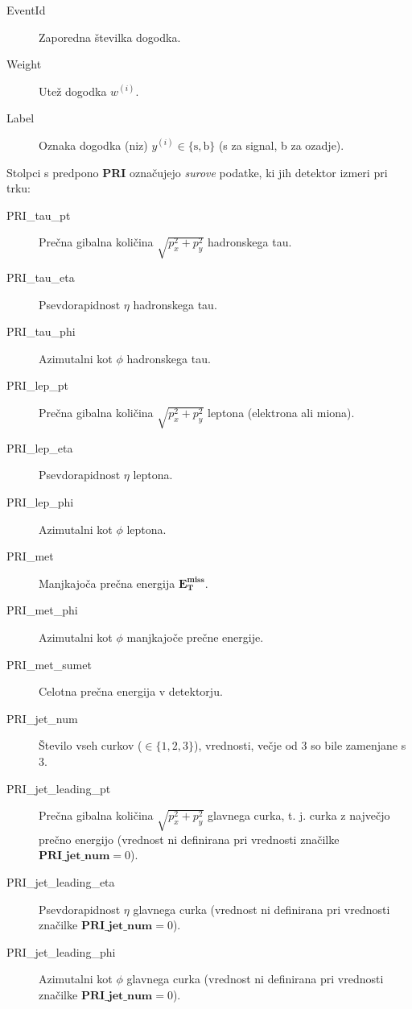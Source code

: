 \documentclass[11pt,a4paper,openany]{book}
\begin{document}
\begin{changemargin}{0.5cm}{0.0cm} 
\begin{description}
	\item [EventId] 	Zaporedna številka dogodka.
	\item [Weight]  	Utež dogodka $w^{(i)}$.
	\item [Label] 		Oznaka dogodka (niz) $y^{(i)} \in \{\text{s}, \text{b}\}$ (s za signal, b za ozadje).	
\end{description}
\end{changemargin}

Stolpci s predpono \textbf{PRI} označujejo \textit{surove} podatke, ki jih detektor izmeri pri trku:
\begin{changemargin}{0.5cm}{0.0cm} 
\begin{description}
	\item[PRI\_tau\_pt] Prečna gibalna količina $\sqrt{p_x^2 + p_y^2}$ hadronskega tau.
	\item[PRI\_tau\_eta] Psevdorapidnost $\eta$ hadronskega tau.
	\item[PRI\_tau\_phi] Azimutalni kot $\phi$ hadronskega tau.
	
	\item[PRI\_lep\_pt] Prečna gibalna količina $\sqrt{p_x^2 + p_y^2}$ leptona (elektrona ali miona).
	\item[PRI\_lep\_eta] Psevdorapidnost $\eta$ leptona.
	\item[PRI\_lep\_phi] Azimutalni kot $\phi$ leptona.
	
	\item[PRI\_met] Manjkajoča prečna energija $\mathbf{E_T^{\text{miss}}}$.
	\item[PRI\_met\_phi] Azimutalni kot $\phi$ manjkajoče prečne energije.
	
	\item[PRI\_met\_sumet] Celotna prečna energija v detektorju.
	
	\item[PRI\_jet\_num] Število vseh curkov ($\in \{1, 2, 3\}$), vrednosti, večje od $3$ so bile zamenjane s 3.
	
	\item[PRI\_jet\_leading\_pt] Prečna gibalna količina $\sqrt{p_x^2 + p_y^2}$ glavnega curka, t. j. curka z največjo prečno energijo (vrednost ni definirana pri vrednosti značilke $\textbf{PRI\_jet\_num} = 0$).
	\item[PRI\_jet\_leading\_eta] Psevdorapidnost $\eta$ glavnega curka (vrednost ni definirana pri vrednosti značilke $\textbf{PRI\_jet\_num} = 0$).
	\item[PRI\_jet\_leading\_phi] Azimutalni kot $\phi$ glavnega curka (vrednost ni definirana pri vrednosti značilke $\textbf{PRI\_jet\_num} = 0$).
	

\end{description}
\end{changemargin}
\end{document}
